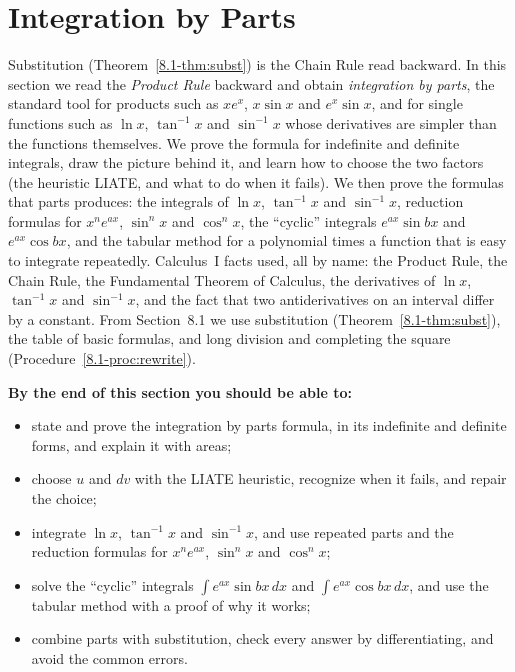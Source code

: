\documentclass[11pt]{article}
\begin{document}
\section{Integration by Parts}

\begin{guide}
Substitution (Theorem~\ref{8.1-thm:subst}) is the Chain Rule read backward. In this section we read the \emph{Product Rule} backward and obtain \emph{integration by parts}, the standard tool for products such as $xe^x$, $x\sin x$ and $e^x\sin x$, and for single functions such as $\ln x$, $\tan^{-1}x$ and $\sin^{-1}x$ whose derivatives are simpler than the functions themselves. We prove the formula for indefinite and definite integrals, draw the picture behind it, and learn how to choose the two factors (the heuristic LIATE, and what to do when it fails). We then prove the formulas that parts produces: the integrals of $\ln x$, $\tan^{-1}x$ and $\sin^{-1}x$, reduction formulas for $x^ne^{ax}$, $\sin^nx$ and $\cos^nx$, the ``cyclic'' integrals $e^{ax}\sin bx$ and $e^{ax}\cos bx$, and the tabular method for a polynomial times a function that is easy to integrate repeatedly. Calculus~I facts used, all by name: the Product Rule, the Chain Rule, the Fundamental Theorem of Calculus, the derivatives of $\ln x$, $\tan^{-1}x$ and $\sin^{-1}x$, and the fact that two antiderivatives on an interval differ by a constant. From Section~8.1 we use substitution (Theorem~\ref{8.1-thm:subst}), the table of basic formulas, and long division and completing the square (Procedure~\ref{8.1-proc:rewrite}).
\end{guide}

\textbf{By the end of this section you should be able to:}
\begin{itemize}
  \item state and prove the integration by parts formula, in its indefinite and definite forms, and explain it with areas;
  \item choose $u$ and $dv$ with the LIATE heuristic, recognize when it fails, and repair the choice;
  \item integrate $\ln x$, $\tan^{-1}x$ and $\sin^{-1}x$, and use repeated parts and the reduction formulas for $x^ne^{ax}$, $\sin^nx$ and $\cos^nx$;
  \item solve the ``cyclic'' integrals $\int e^{ax}\sin bx\,dx$ and $\int e^{ax}\cos bx\,dx$, and use the tabular method with a proof of why it works;
  \item combine parts with substitution, check every answer by differentiating, and avoid the common errors.
\end{itemize}
\end{document}
